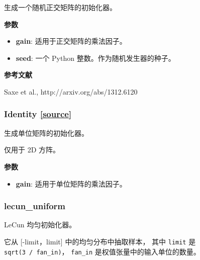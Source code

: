 生成一个随机正交矩阵的初始化器。

\textbf{参数}

\begin{itemize}
\tightlist
\item
  \textbf{gain}: 适用于正交矩阵的乘法因子。
\item
  \textbf{seed}: 一个 Python 整数。作为随机发生器的种子。
\end{itemize}

\textbf{参考文献}

Saxe et al., http://arxiv.org/abs/1312.6120




\subsubsection{Identity {\href{https://github.com/keras-team/keras/blob/master/keras/initializers.py\#L265}{{[}source{]}}}}

\begin{Shaded}
\begin{Highlighting}[]
\OperatorTok{=}\NormalTok{)}
\end{Highlighting}
\end{Shaded}

生成单位矩阵的初始化器。

仅用于 2D 方阵。

\textbf{参数}

\begin{itemize}
\tightlist
\item
  \textbf{gain}: 适用于单位矩阵的乘法因子。
\end{itemize}



\subsubsection{lecun\_uniform}\label{lecunux5funiform}

\begin{Shaded}
\begin{Highlighting}[]
\OperatorTok{=}\NormalTok{)}
\end{Highlighting}
\end{Shaded}

LeCun 均匀初始化器。

它从 {[}-limit，limit{]} 中的均匀分布中抽取样本， 其中 \texttt{limit} 是
\texttt{sqrt(3\ /\ fan\_in)}， \texttt{fan\_in}
是权值张量中的输入单位的数量。

